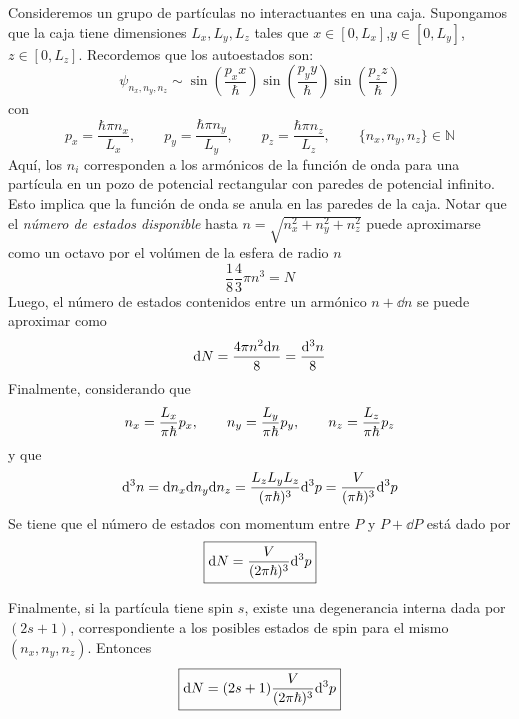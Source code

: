 Consideremos un grupo de partículas no interactuantes en una caja. Supongamos que la caja tiene dimensiones $L_x,L_y,L_z$ tales que $x\in [0,L_x]$,$y\in [0,L_y]$, $z\in [0,L_z]$. Recordemos que los autoestados son:
\begin{equation}
  \psi_{n_x,n_y,n_z}\sim \sin\left(\frac{p_xx}{\hbar}\right)\sin\left(\frac{p_yy}{\hbar}\right)\sin\left(\frac{p_zz}{\hbar}\right)
\end{equation}
con
\begin{equation}
  p_x=\frac{\hbar \pi n_x}{L_x},\qquad p_y=\frac{\hbar \pi n_y}{L_y},\qquad p_z=\frac{\hbar \pi n_z}{L_z},\qquad \{n_x,n_y,n_z\}\in \mathbb{N}
\end{equation}
Aquí, los $n_i$ corresponden a los armónicos de la función de onda para una partícula en un pozo de potencial rectangular con paredes de potencial infinito. Esto implica que la función de onda se anula en las paredes de la caja. Notar que el \textit{número de estados disponible} hasta $n=\sqrt{n_x^2+n_y^2+n_z^2}$ puede aproximarse como un octavo por el volúmen de la esfera de radio $n$
\begin{equation}
  \frac{1}{8}\frac{4}{3}\pi n^3=N
\end{equation}
Luego, el número de estados contenidos entre un armónico $n+\dd n$ se puede aproximar como
\begin{equation}
  \dd N=\frac{4\pi n^2\dd n}{8}=\frac{\dd^3n}{8}
\end{equation}
Finalmente, considerando que
\begin{equation}
  n_x=\frac{L_x}{\pi\hbar}p_x,\qquad n_y=\frac{L_y}{\pi\hbar}p_y,\qquad n_z=\frac{L_z}{\pi\hbar}p_z
\end{equation}
y que
\begin{equation}
  \dd^3n=\dd n_x\dd n_y\dd n_z=\frac{L_zL_yL_z}{(\pi\hbar)^3}\dd^3p=\frac{V}{(\pi\hbar)^3}\dd^3p
\end{equation}
Se tiene que el número de estados con momentum entre $P$ y $P+\dd P$ está dado por
\begin{equation}
\boxed{  \dd N=\frac{V}{(2\pi\hbar)^3}\dd^3p}
\end{equation}

Finalmente, si la partícula tiene spin $s$, existe una degenerancia interna dada por $(2s+1)$, correspondiente a los posibles estados de spin para el mismo $(n_x,n_y,n_z)$. Entonces
\begin{equation}
\boxed{  \dd N=(2s+1)\frac{V}{(2\pi\hbar)^3}\dd^3p}
\end{equation}

